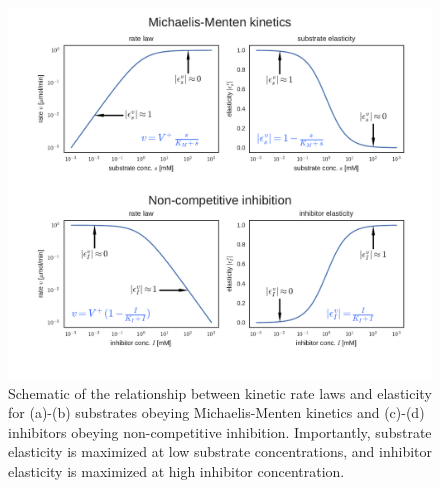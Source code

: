 \documentclass[12pt,a4paper]{article}
\begin{document}
\begin{figure}[ht!]
	\includegraphics[width=1.1\textwidth]{../manuscript/figS4.pdf}
	\caption{Schematic of the relationship between kinetic rate laws and elasticity for (a)-(b) substrates obeying Michaelis-Menten kinetics and (c)-(d) inhibitors obeying non-competitive inhibition. Importantly, substrate elasticity is maximized at low substrate concentrations, and inhibitor elasticity is maximized at high inhibitor concentration.
	}
\end{figure}
\end{document}
